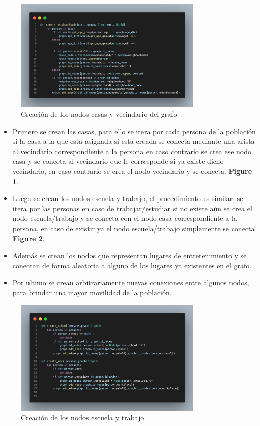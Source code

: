 \documentclass{article}
\begin{document}
\begin{figure}[h]
        \centering
        \includegraphics[width=0.8\textwidth]{neighborhood.png}
        \centering
        \caption{Creación de los nodos casas y vecindario del grafo}
    \end{figure}
\begin{itemize}
    \item Primero se crean las casas, para ello se itera por cada persona de la población si la casa a la que esta asignada si esta creada se conecta mediante una arista al vecindario correspondiente a la persona en caso contrario se crea ese nodo casa y se conecta al vecindario que le corresponde si ya existe dicho vecindario, en caso contrario se crea el nodo vecindario y se conecta. \textbf{Figure 1}.
    \item Luego se crean los nodos escuela y trabajo, el procedimiento es similar, se itera por las personas en caso de trabajar/estudiar si no existe aún se crea el nodo escuela/trabajo y se conecta con el nodo casa correspondiente a la persona, en caso de existir ya el nodo escuela/trabajo simplemente se conecta \textbf{Figure 2}.
    \item Adem\'as se crean los nodos que representan lugares de entretenimiento y se conectan de forma aleatoria a alguno de los lugares ya existentes en el grafo.
    \item Por ultimo se crean arbitrariamente nuevas conexiones entre algunos nodos, para brindar una mayor movilidad de la población. 
\end{itemize}

\newpage

\begin{figure}[h]
        \centering
        \includegraphics[width=0.8\textwidth, height=0.3\textheight]{school_work.png}
        \centering
        \caption{Creación de los nodos escuela y trabajo}
    \end{figure}
\end{document}
